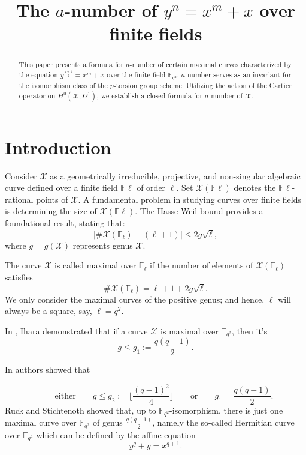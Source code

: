 
\title{The $a$-number of $y^n=x^m+x$ over finite fields}
\begin{abstract}
This paper presents a formula for $a$-number of certain maximal curves characterized by the equation $y^{\frac{q+1}{2}} = x^m + x$ over the finite field $\mathbb{F}_{q^2}$. $a$-number serves as an invariant for the isomorphism class of the $p$-torsion group scheme. Utilizing the action of the Cartier operator on $H^0(\mathcal{X}, \Omega^1)$, we establish a closed formula for $a$-number of $\mathcal{X}$.


\end{abstract}
\maketitle
\section{Introduction}

Consider $\mathcal{X}$ as a geometrically irreducible, projective, and non-singular algebraic curve defined over a finite field $\mathbb{F}{\ell}$ of order $\ell$. Set $\mathcal{X}(\mathbb{F}{\ell})$ denotes the $\mathbb{F}{\ell}$-rational points of $\mathcal{X}$. A fundamental problem in studying curves over finite fields is determining the size of $\mathcal{X}(\mathbb{F}{\ell})$. The Hasse-Weil bound provides a foundational result, stating that:
$$\mid \# \mathcal{X}(\mathbb{F}_{\ell}) - (\ell +1) \mid \leq 2g \sqrt{\ell},$$
where $g = g(\mathcal{X})$ represents genus $\mathcal{X}$.


The curve $\mathcal{X}$ is called maximal over $\mathbb{F}_{\ell}$ if the number of elements of $\mathcal{X}(\mathbb{F}_{\ell})$ satisfies
$$\# \mathcal{X}(\mathbb{F}_{\ell})= \ell + 1 + 2g \sqrt{\ell}.$$
We only consider the maximal curves of the positive genus; and hence, $\ell$ will always be a square, say, $\ell = q^2$.


In \cite{ih}, Ihara demonstrated that if a curve $\mathcal{X}$ is maximal over $\mathbb{F}_{q^2}$, then it's
$$g \leq g_1:= \dfrac{q(q-1)}{2}.$$



In \cite{tor} authors showed that

$$\qquad  \mbox{either} \qquad g \leq g_2 := \lfloor \frac{(q-1)^2}{4} \rfloor \qquad  \mbox{or} \qquad  g_1=\frac{q(q-1)}{2}. $$
Ruck and Stichtenoth \cite{stir} showed that, up to  $\mathbb{F}_{q^2}$-isomorphism, there is just one maximal curve over $\mathbb{F}_{q^2}$ of genus  $\frac{q(q-1)}{2}$, namely the so-called Hermitian curve over $\mathbb{F}_{q^2}$ which can be defined by the affine equation
 \begin{equation}\label{xxx1}
y^{q}+y=x^{q+1}.
 \end{equation}

